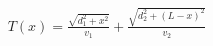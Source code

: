 \documentclass[preview]{standalone}
\begin{document}
\begin{align*}
T(x) = \frac{\sqrt{d_1^2 + x^2}}{v_1} + \frac{\sqrt{d_2^2 + (L-x)^2}}{v_2}
\end{align*}
\end{document}
